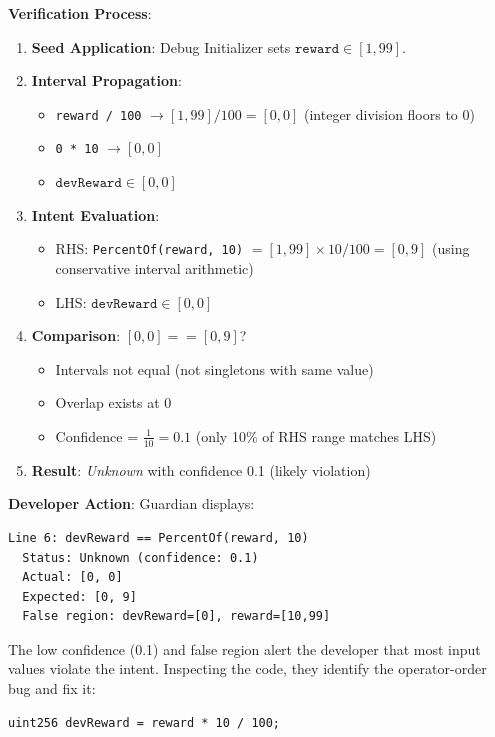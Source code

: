 \documentclass[pdflatex,sn-basic]{sn-jnl}%
\theoremstyle{thmstyleone}%
\theoremstyle{thmstyletwo}%
\theoremstyle{thmstylethree}%
\begin{document}
\textbf{Verification Process}:
\begin{enumerate}
    \item \textbf{Seed Application}: Debug Initializer sets $\texttt{reward} \in [1, 99]$.
    \item \textbf{Interval Propagation}:
    \begin{itemize}
        \item \texttt{reward / 100} $\rightarrow [1, 99] / 100 = [0, 0]$ (integer division floors to 0)
        \item \texttt{0 * 10} $\rightarrow [0, 0]$
        \item $\texttt{devReward} \in [0, 0]$
    \end{itemize}
    \item \textbf{Intent Evaluation}:
    \begin{itemize}
        \item RHS: \texttt{PercentOf(reward, 10)} $= [1, 99] \times 10 / 100 = [0, 9]$ (using conservative interval arithmetic)
        \item LHS: $\texttt{devReward} \in [0, 0]$
    \end{itemize}
    \item \textbf{Comparison}: $[0, 0] == [0, 9]$?
    \begin{itemize}
        \item Intervals not equal (not singletons with same value)
        \item Overlap exists at 0
        \item Confidence = $\frac{1}{10} = 0.1$ (only 10\% of RHS range matches LHS)
    \end{itemize}
    \item \textbf{Result}: \textit{Unknown} with confidence 0.1 (likely violation)
\end{enumerate}

\textbf{Developer Action}: Guardian displays:
\begin{verbatim}
Line 6: devReward == PercentOf(reward, 10)
  Status: Unknown (confidence: 0.1)
  Actual: [0, 0]
  Expected: [0, 9]
  False region: devReward=[0], reward=[10,99]
\end{verbatim}

The low confidence (0.1) and false region alert the developer that most input values violate the intent. Inspecting the code, they identify the operator-order bug and fix it:

\begin{lstlisting}[language=Solidity]
uint256 devReward = reward * 10 / 100;
\end{lstlisting}
\end{document}
